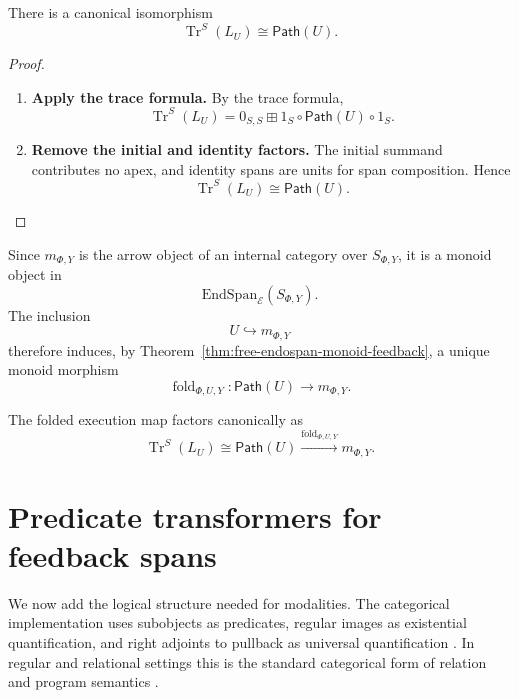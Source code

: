 \begin{theorem}
\label{thm:execution-paths-as-feedback}
There is a canonical isomorphism
\[
  \operatorname{Tr}^{S}(L_U)
  \cong
  \mathsf{Path}(U).
\]
\end{theorem}

\begin{proof}
\begin{enumerate}
  \item \textbf{Apply the trace formula.}
  By the trace formula,
  \[
    \operatorname{Tr}^{S}(L_U)
    =
    0_{S,S}
    \boxplus
    1_S\circ\mathsf{Path}(U)\circ1_S.
  \]

  \item \textbf{Remove the initial and identity factors.}
  The initial summand contributes no apex, and identity spans are units for
  span composition. Hence
  \[
    \operatorname{Tr}^{S}(L_U)
    \cong
    \mathsf{Path}(U).
  \]
\end{enumerate}
\end{proof}

Since \(m_{\Phi,Y}\) is the arrow object of an internal category over
\(S_{\Phi,Y}\), it is a monoid object in
\[
  \mathrm{EndSpan}_{\mathcal E}(S_{\Phi,Y}).
\]
The inclusion
\[
  U\hookrightarrow m_{\Phi,Y}
\]
therefore induces, by Theorem~\ref{thm:free-endospan-monoid-feedback}, a
unique monoid morphism
\[
  \operatorname{fold}_{\Phi,U,Y}:
  \mathsf{Path}(U)\longrightarrow m_{\Phi,Y}.
\]

\begin{corollary}
\label{cor:folded-feedback}
The folded execution map factors canonically as
\[
  \operatorname{Tr}^{S}(L_U)
  \cong
  \mathsf{Path}(U)
  \xrightarrow{\operatorname{fold}_{\Phi,U,Y}}
  m_{\Phi,Y}.
\]
\end{corollary}

\section{Predicate transformers for feedback spans}
\label{sec:predicate-transformers-feedback}

We now add the logical structure needed for modalities. The categorical
implementation uses subobjects as predicates, regular images as existential
quantification, and right adjoints to pullback as universal quantification
\cite{Jacobs1999CategoricalLogic}. In regular and relational settings this is
the standard categorical form of relation and program semantics
\cite{FongSpivakRegularRelational,HarelKozenTiurynDynamicLogic}.

